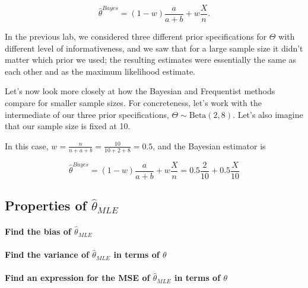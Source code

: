 \documentclass[]{article}
\let\oldparagraph\paragraph
\renewcommand{\paragraph}[1]{\oldparagraph{#1}\mbox{}}
\begin{document}
\[\hat{\theta}^{Bayes} = (1 - w) \frac{a}{a + b} + w\frac{X}{n}.\]

In the previous lab, we considered three different prior specifications
for \(\Theta\) with different level of informativeness, and we saw that
for a large sample size it didn't matter which prior we used; the
resulting estimates were essentially the same as each other and as the
maximum likelihood estimate.

Let's now look more closely at how the Bayesian and Frequentist methods
compare for smaller sample sizes. For concreteness, let's work with the
intermediate of our three prior specifications,
\(\Theta \sim \text{Beta}(2, 8)\). Let's also imagine that our sample
size is fixed at 10.

In this case, \(w = \frac{n}{n + a + b} = \frac{10}{10 + 2 + 8} = 0.5\),
and the Bayesian estimator is

\[\hat{\theta}^{Bayes} = (1 - w) \frac{a}{a + b} + w\frac{X}{n} = 0.5 \frac{2}{10} + 0.5\frac{X}{10}\]

\subsection{\texorpdfstring{Properties of
\(\hat{\theta}_{MLE}\)}{Properties of \textbackslash{}hat\{\textbackslash{}theta\}\_\{MLE\}}}\label{properties-of-hattheta_mle}

\paragraph{\texorpdfstring{Find the bias of
\(\hat{\theta}_{MLE}\)}{Find the bias of \textbackslash{}hat\{\textbackslash{}theta\}\_\{MLE\}}}\label{find-the-bias-of-hattheta_mle}

\vspace{3cm}

\paragraph{\texorpdfstring{Find the variance of \(\hat{\theta}_{MLE}\)
in terms of
\(\theta\)}{Find the variance of \textbackslash{}hat\{\textbackslash{}theta\}\_\{MLE\} in terms of \textbackslash{}theta}}\label{find-the-variance-of-hattheta_mle-in-terms-of-theta}

\vspace{3cm}

\paragraph{\texorpdfstring{Find an expression for the MSE of
\(\hat{\theta}_{MLE}\) in terms of
\(\theta\)}{Find an expression for the MSE of \textbackslash{}hat\{\textbackslash{}theta\}\_\{MLE\} in terms of \textbackslash{}theta}}\label{find-an-expression-for-the-mse-of-hattheta_mle-in-terms-of-theta}
\end{document}
